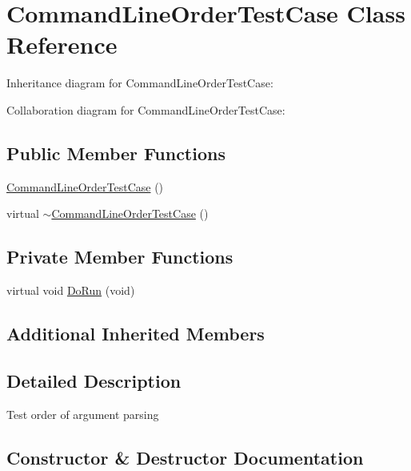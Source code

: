 \hypertarget{classCommandLineOrderTestCase}{}\section{Command\+Line\+Order\+Test\+Case Class Reference}
\label{classCommandLineOrderTestCase}


Inheritance diagram for Command\+Line\+Order\+Test\+Case\+:


Collaboration diagram for Command\+Line\+Order\+Test\+Case\+:
\subsection*{Public Member Functions}
\begin{DoxyCompactItemize}
\item 
\hyperlink{classCommandLineOrderTestCase_a6cc15610bf6b1a8a96490845fa700aee}{Command\+Line\+Order\+Test\+Case} ()
\item 
virtual \hyperlink{classCommandLineOrderTestCase_a321043a02516ae468fbc61bc138840ec}{$\sim$\+Command\+Line\+Order\+Test\+Case} ()
\end{DoxyCompactItemize}
\subsection*{Private Member Functions}
\begin{DoxyCompactItemize}
\item 
virtual void \hyperlink{classCommandLineOrderTestCase_a4a367b89b87425d6c459c01730987523}{Do\+Run} (void)
\end{DoxyCompactItemize}
\subsection*{Additional Inherited Members}


\subsection{Detailed Description}
Test order of argument parsing 

\subsection{Constructor \& Destructor Documentation}

